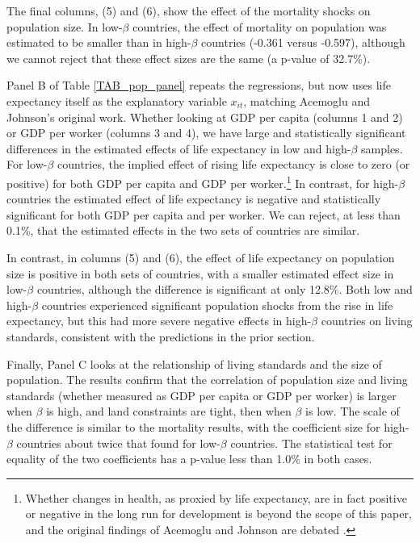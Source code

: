 \documentclass[11pt]{article}
\begin{document}
The final columns, (5) and (6), show the effect of the mortality shocks on population size. In low-$\beta$ countries, the effect of mortality on population was estimated to be smaller than in high-$\beta$ countries (-0.361 versus -0.597), although we cannot reject that these effect sizes are the same (a p-value of 32.7\%). 

Panel B of Table \ref{TAB_pop_panel} repeats the regressions, but now uses life expectancy itself as the explanatory variable $x_{it}$, matching Acemoglu and Johnson's original work. Whether looking at GDP per capita (columns 1 and 2) or GDP per worker (columns 3 and 4), we have large and statistically significant differences in the estimated effects of life expectancy in low and high-$\beta$ samples. For low-$\beta$ countries, the implied effect of rising life expectancy is close to zero (or positive) for both GDP per capita and GDP per worker.\footnote{Whether changes in health, as proxied by life expectancy, are in fact positive or negative in the long run for development is beyond the scope of this paper, and the original findings of Acemoglu and Johnson are debated \citep{bcf2014}.} In contrast, for high-$\beta$ countries the estimated effect of life expectancy is negative and statistically significant for both GDP per capita and per worker. We can reject, at less than 0.1\%, that the estimated effects in the two sets of countries are similar. 

In contrast, in columns (5) and (6), the effect of life expectancy on population size is positive in both sets of countries, with a smaller estimated effect size in low-$\beta$ countries, although the difference is significant at only 12.8\%. Both low and high-$\beta$ countries experienced significant population shocks from the rise in life expectancy, but this had more severe negative effects in high-$\beta$ countries on living standards, consistent with the predictions in the prior section.

Finally, Panel C looks at the relationship of living standards and the size of population. The results confirm that the correlation of population size and living standards (whether measured as GDP per capita or GDP per worker) is larger when $\beta$ is high, and land constraints are tight, then when $\beta$ is low. The scale of the difference is similar to the mortality results, with the coefficient size for high-$\beta$ countries about twice that found for low-$\beta$ countries. The statistical test for equality of the two coefficients has a p-value less than 1.0\% in both cases.
\end{document}
